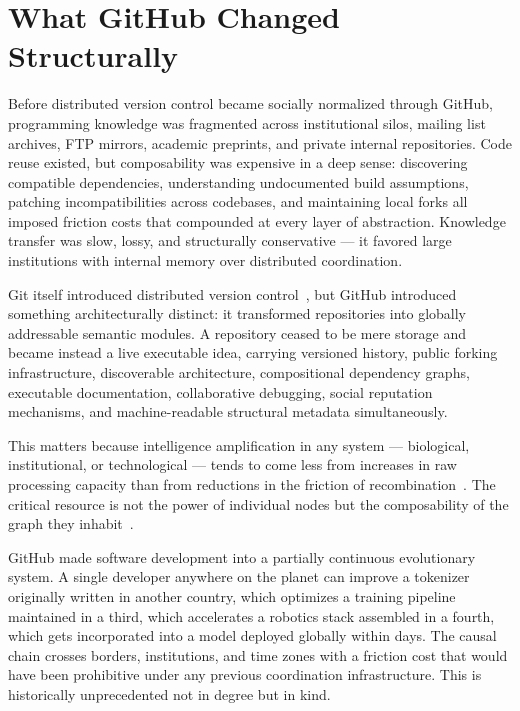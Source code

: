 \documentclass[12pt]{article}
\begin{document}
\section{What GitHub Changed Structurally}

Before distributed version control became socially normalized through GitHub,
programming knowledge was fragmented across institutional silos, mailing list
archives, FTP mirrors, academic preprints, and private internal repositories.
Code reuse existed, but composability was expensive in a deep sense: discovering
compatible dependencies, understanding undocumented build assumptions, patching
incompatibilities across codebases, and maintaining local forks all imposed
friction costs that compounded at every layer of abstraction. Knowledge transfer
was slow, lossy, and structurally conservative --- it favored large institutions
with internal memory over distributed coordination.

Git itself introduced distributed version control~\cite{git2005,torvalds2001},
but GitHub introduced something architecturally distinct: it transformed
repositories into globally addressable semantic modules. A repository ceased to be mere storage and became
instead a live executable idea, carrying versioned history, public forking
infrastructure, discoverable architecture, compositional dependency graphs,
executable documentation, collaborative debugging, social reputation mechanisms,
and machine-readable structural metadata simultaneously.

This matters because intelligence amplification in any system --- biological,
institutional, or technological --- tends to come less from increases in raw
processing capacity than from reductions in the friction of recombination~\cite{simon1962,wiener1948}.
The critical resource is not the power of individual nodes but the composability
of the graph they inhabit~\cite{barabasi2002}.

GitHub made software development into a partially continuous evolutionary
system. A single developer anywhere on the planet can improve a tokenizer
originally written in another country, which optimizes a training pipeline
maintained in a third, which accelerates a robotics stack assembled in a fourth,
which gets incorporated into a model deployed globally within days. The causal
chain crosses borders, institutions, and time zones with a friction cost that
would have been prohibitive under any previous coordination infrastructure.
This is historically unprecedented not in degree but in kind.
\end{document}
